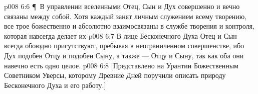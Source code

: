 \vs p008 6:6 \P\ В управлении вселенными Отец, Сын и Дух совершенно и вечно связаны между собой. Хотя каждый занят личным служением всему творению, все трое божественно и абсолютно взаимосвязаны в службе творения и контроля, которая навсегда делает их 
\vs p008 6:7 В лице Бесконечного Духа Отец и Сын всегда обоюдно присутствуют, пребывая в неограниченном совершенстве, ибо Дух подобен Отцу и подобен Сыну, а также --- Отцу и Сыну, так как оба они навечно есть одно целое.
\vs p008 6:8 [Представлено на Урантии Божественным Советником Уверсы, которому Древние Дней поручили описать природу Бесконечного Духа и его работу.]
